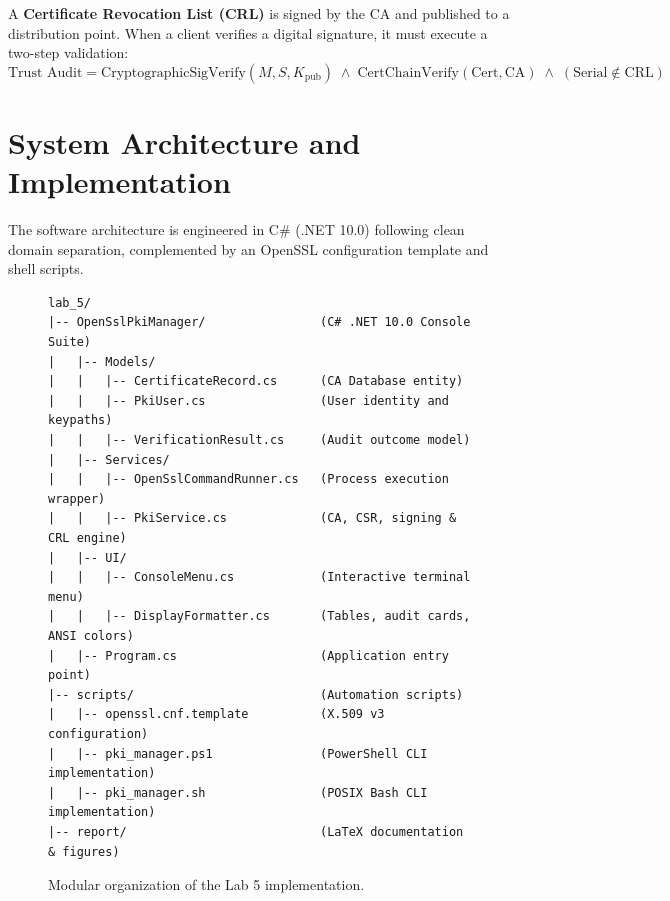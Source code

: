\documentclass[12pt,a4paper]{article}
\begin{document}
A \textbf{Certificate Revocation List (CRL)} is signed by the CA and published to a distribution point. When a client verifies a digital signature, it must execute a two-step validation:
\begin{equation}
    \text{Trust Audit} = \text{CryptographicSigVerify}(M, S, K_{\text{pub}}) \;\land\; \text{CertChainVerify}(\text{Cert}, \text{CA}) \;\land\; (\text{Serial} \notin \text{CRL})
\end{equation}

\section{System Architecture and Implementation}

The software architecture is engineered in C\# (.NET 10.0) following clean domain separation, complemented by an OpenSSL configuration template and shell scripts.

\begin{figure}[h!]
\centering
\begin{tcolorbox}[colback=white,colframe=primary,arc=2mm,title=\textbf{Lab 5 Project Workspace Layout}]
\begin{verbatim}
lab_5/
|-- OpenSslPkiManager/                (C# .NET 10.0 Console Suite)
|   |-- Models/
|   |   |-- CertificateRecord.cs      (CA Database entity)
|   |   |-- PkiUser.cs                (User identity and keypaths)
|   |   |-- VerificationResult.cs     (Audit outcome model)
|   |-- Services/
|   |   |-- OpenSslCommandRunner.cs   (Process execution wrapper)
|   |   |-- PkiService.cs             (CA, CSR, signing & CRL engine)
|   |-- UI/
|   |   |-- ConsoleMenu.cs            (Interactive terminal menu)
|   |   |-- DisplayFormatter.cs       (Tables, audit cards, ANSI colors)
|   |-- Program.cs                    (Application entry point)
|-- scripts/                          (Automation scripts)
|   |-- openssl.cnf.template          (X.509 v3 configuration)
|   |-- pki_manager.ps1               (PowerShell CLI implementation)
|   |-- pki_manager.sh                (POSIX Bash CLI implementation)
|-- report/                           (LaTeX documentation & figures)
\end{verbatim}
\end{tcolorbox}
\caption{Modular organization of the Lab 5 implementation.}
\end{figure}
\end{document}
